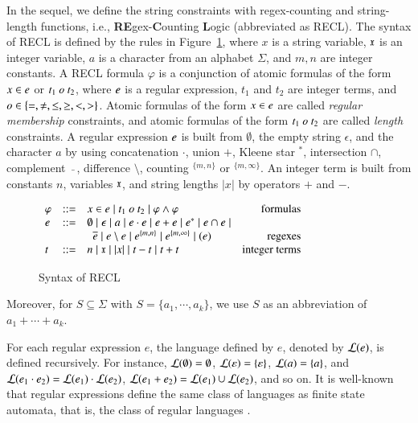 In the sequel, we define the string constraints with regex-counting and string-length functions, i.e., \textbf{RE}gex-\textbf{C}ounting \textbf{L}ogic (abbreviated as RECL). The syntax of RECL is defined by the rules in Figure~\ref{fig:syntax}, where $x$ is a string variable, $\mathfrak{x}$ is an integer variable, $a$ is a character from an alphabet $\Sigma$, and $m, n$ are integer constants. 
A RECL formula $\varphi$ is a conjunction of atomic formulas of the form $x \in e$ or $t_1\ o\ t_2$, where $e$ is a regular expression,  
$t_1$ and $t_2$ are integer terms, and $o \in \{=, \neq, \le, \ge, <, >\}$. Atomic formulas of the form $x \in e$ are called \emph{regular membership} constraints, and atomic formulas of the form $t_1\ o\ t_2$ are called \emph{length} constraints. 
%
A regular expression $e$ is built from $\emptyset$, the empty string $\epsilon$, and the character $a$ by using concatenation  $\cdot$, union $+$, Kleene star $^*$, intersection $\cap$, complement $\bar{\mbox{ }}$, difference $\setminus$, counting $^{\{m,n\}}$ or $^{\{m,\infty\}}$. An integer term is built from constants $n$, variables $\mathfrak{x}$, and string lengths $|x|$ by operators $+$ and $-$.
% 
\begin{figure}[h]
\vspace{-2mm}
  \centering
$ \begin{array}{l l l r}
    \varphi & ::= & x\in e \mid t_1\  o\ t_2 \mid  \varphi \wedge \varphi                                              & \mbox{formulas}            \\
    e &::= & \emptyset \mid \epsilon \mid a \mid e\cdot e \mid  e+e \mid e^* \mid e \cap e \mid \\
    & & \ \ \overline{e} \mid e \setminus e \mid e^{\{m,n\}} \mid e^{\{m,\infty\}} \mid (e) & \mbox{regexes} \\
    t &::= & n \mid \mathfrak{x} \mid  |x| \mid t - t \mid t + t                                                                    & \mbox{integer terms}
    \end{array}
  $
  \caption{Syntax of RECL }\label{fig:syntax}
\vspace{-2mm}
\end{figure}

Moreover, for $S \subseteq \Sigma$ with $S = \{a_1, \cdots, a_k\}$, we use $S$ as an abbreviation of $a_1 + \cdots + a_k$.

For each regular expression $e$, the language defined by $e$, denoted by $\mathcal{L}(e)$, is defined recursively. For instance, $\mathcal{L}(\emptyset) = \emptyset$, $\mathcal{L}(\varepsilon) = \{\varepsilon\}$, $\mathcal{L}(a) = \{a\}$, and $\mathcal{L}(e_1 \cdot e_2) = \mathcal{L}(e_1) \cdot \mathcal{L}(e_2)$, $\mathcal{L}(e_1 + e_2) = \mathcal{L}(e_1) \cup \mathcal{L}(e_2)$, and so on. 
It is well-known that regular expressions define the same class of languages as finite state automata, that is, the class of regular languages \cite{HU79}. 

